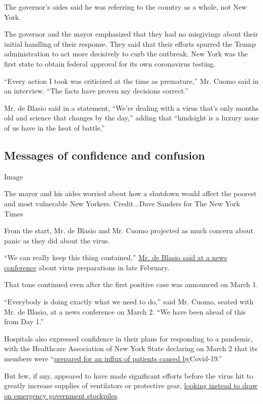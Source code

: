 The governor's aides said he was referring to the country as a whole,
not New York.

The governor and the mayor emphasized that they had no misgivings about
their initial handling of their response. They said that their efforts
spurred the Trump administration to act more decisively to curb the
outbreak. New York was the first state to obtain federal approval for
its own coronavirus testing.

``Every action I took was criticized at the time as premature,'' Mr.
Cuomo said in an interview. ``The facts have proven my decisions
correct.''

Mr. de Blasio said in a statement, ``We're dealing with a virus that's
only months old and science that changes by the day,'' adding that
``hindsight is a luxury none of us have in the heat of battle.''

\hypertarget{messages-of-confidence-and-confusion}{%
\subsection{Messages of confidence and
confusion}\label{messages-of-confidence-and-confusion}}

Image

The mayor and his aides worried about how a shutdown would affect the
poorest and most vulnerable New Yorkers. Credit...Dave Sanders for The
New York Times

From the start, Mr. de Blasio and Mr. Cuomo projected as much concern
about panic as they did about the virus.

``We can really keep this thing contained,''
\href{https://www.nytimes.com/2020/02/27/nyregion/new-york-coronavirus.html}{Mr.
de Blasio said at a news conference} about virus preparations in late
February.

That tone continued even after the first positive case was announced on
March 1.

``Everybody is doing exactly what we need to do,'' said Mr. Cuomo,
seated with Mr. de Blasio, at a news conference on March 2. ``We have
been ahead of this from Day 1.''

Hospitals also expressed confidence in their plans for responding to a
pandemic, with the Healthcare Association of New York State declaring on
March 2 that its members were
``\href{https://www.hanys.org/communications/pr/2020/2020-03-02_coronavirus.cfm}{prepared
for an influx of patients caused by}Covid-19.''

But few, if any, appeared to have made significant efforts before the
virus hit to greatly increase supplies of ventilators or protective
gear,
\href{https://www.gnyha.org/wp-content/uploads/2020/03/3_GNYHA-Statement-Hospital-Preparedness-for-Coronavirus.pdf}{looking
instead to draw on emergency government stockpiles}.

